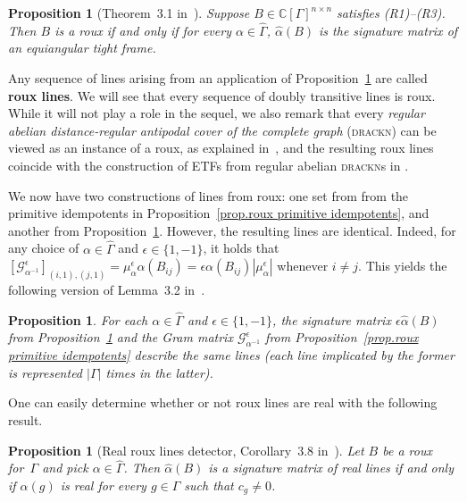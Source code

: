 \documentclass[11pt]{article}
\newtheorem{proposition}[theo]{Proposition}
\theoremstyle{definition}
\numberwithin{equation}{section}
\begin{document}
\begin{proposition}[Theorem~3.1 in~\cite{IversonM:18}]
\label{prop.roux signature}
Suppose $B\in\mathbb{C}[\Gamma]^{n\times n}$ satisfies (R1)--(R3).
Then $B$ is a roux if and only if for every $\alpha\in\hat{\Gamma}$, $\hat\alpha(B)$ is the signature matrix of an equiangular tight frame.
\end{proposition}

Any sequence of lines arising from an application of Proposition~\ref{prop.roux signature} are called \textbf{roux lines}.
We will see that every sequence of doubly transitive lines is roux.
While it will not play a role in the sequel, we also remark that every \textit{regular abelian distance-regular antipodal cover of the complete graph} (\textsc{drackn}) can be viewed as an instance of a roux, as explained in~\cite{IversonM:18}, and the resulting roux lines coincide with the construction of ETFs from regular abelian \textsc{drackn}s in \cite{GodsilHensel:92,CoutinhoGSZ:16}. 

We now have two constructions of lines from roux: one set from from the primitive idempotents in Proposition~\ref{prop.roux primitive idempotents}, and another from Proposition~\ref{prop.roux signature}.
However, the resulting lines are identical.
Indeed, for any choice of $\alpha \in \hat{\Gamma}$ and $\epsilon \in \{1,-1\}$, it holds that $[\mathcal{G}_{\alpha^{-1}}^\epsilon]_{(i,1),(j,1)} = \mu_{\alpha}^\epsilon \alpha(B_{ij})=\epsilon \alpha(B_{ij}) |\mu_{\alpha}^\epsilon|$ whenever $i \neq j$.
This yields the following version of Lemma~3.2 in~\cite{IversonM:18}.


\begin{proposition}
\label{prop.two reps of same lines}
For each $\alpha\in\hat\Gamma$ and $\epsilon \in \{1,-1\}$, the signature matrix $\epsilon \hat{\alpha}(B)$ from Proposition~\ref{prop.roux signature} and the Gram matrix $\mathcal{G}_{\alpha^{-1}}^\epsilon$ from Proposition~\ref{prop.roux primitive idempotents} describe the same lines (each line implicated by the former is represented $|\Gamma|$ times in the latter).
\end{proposition}

One can easily determine whether or not roux lines are real with the following result.

\begin{proposition}[Real roux lines detector, Corollary~3.8 in~\cite{IversonM:18}]
\label{prop.real line detector}
Let $B$ be a roux for~$\Gamma$ and pick $\alpha\in\hat\Gamma$.
Then $\hat\alpha(B)$ is a signature matrix of real lines if and only if $\alpha(g)$ is real for every $g\in\Gamma$ such that $c_g\neq0$.
\end{proposition}
\end{document}
